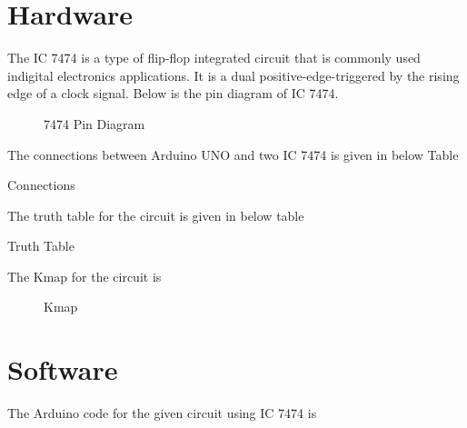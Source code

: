 \documentclass{article}
\begin{document}
\section{Hardware}
	The IC 7474 is a type of flip-flop integrated circuit that is commonly used indigital electronics applications. It is a dual positive-edge-triggered by the rising edge of a clock signal. Below is the pin diagram of IC 7474. \\
	\begin{figure}[H]
		\centering
	
		\caption{7474 Pin Diagram}
		\label{fig:2}
	\end{figure}

	The connections between Arduino UNO and two IC 7474 is given in below Table \\
	\begin{table}[H]
	\begin{center}
	
	\end{center}
		\caption{Connections}
		\label{table:1}
	\end{table}

	The truth table for the circuit is given in below table \\
	\begin{table}[H]
		\begin{center}
	
		\caption{Truth Table}
		\label{table:2}
		\end{center}
	\end{table}
	
	The Kmap for the circuit is \\
	\begin{figure}[H]
		\centering
	
	\caption{Kmap}
	\label{fig:3}
	\end{figure}

\section{Software}
	The Arduino code for the given circuit using IC 7474 is \\
	
\end{document}
